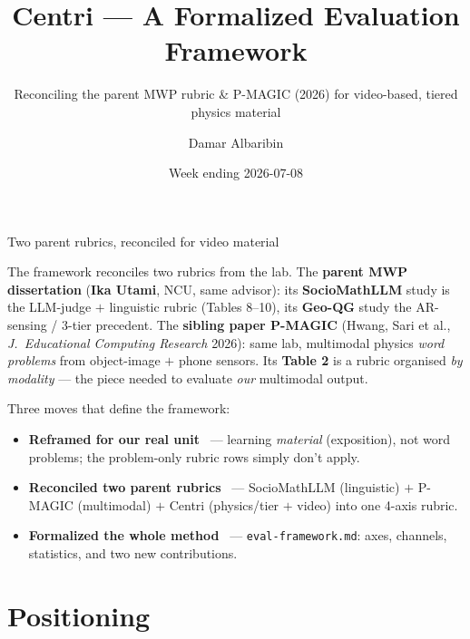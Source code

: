 \documentclass[aspectratio=169,10pt]{beamer}
\title{Centri --- A Formalized Evaluation Framework}
\subtitle{Reconciling the parent MWP rubric \& P-MAGIC (2026) for video-based, tiered physics material}
\author{Damar Albaribin}
\institute{MSc Thesis --- advisor: Prof.\ Wu-Yuin Hwang}
\date{Week ending 2026-07-08}
\newcommand{\ok}{{\color{cApp}\textbf{\checkmark}}}
\begin{document}
\maketitle

\begin{frame}{Two parent rubrics, reconciled for video material}
\small
\begin{tcolorbox}[colback=cGrey!8,colframe=cGrey,title=\footnotesize The two parents,boxsep=2pt,left=4pt,right=4pt]
\scriptsize
The framework reconciles two rubrics from the lab. The \textbf{parent MWP dissertation}
(\textbf{Ika Utami}, NCU, same advisor): its \textbf{SocioMathLLM} study is the LLM-judge $+$ linguistic
rubric (Tables 8--10), its \textbf{Geo-QG} study the AR-sensing / 3-tier precedent. The \textbf{sibling
paper P-MAGIC} (Hwang, Sari et al., \emph{J.\ Educational Computing Research} 2026): same lab, multimodal
physics \emph{word problems} from object-image $+$ phone sensors. Its \textbf{Table 2} is a rubric organised
\emph{by modality} --- the piece needed to evaluate \emph{our} multimodal output.
\end{tcolorbox}
\vspace{0.3em}
Three moves that define the framework:
\begin{itemize}\setlength\itemsep{2pt}
  \item \textbf{\color{cMeas}Reframed for our real unit} \ok\ --- learning \emph{material} (exposition),
  not word problems; the problem-only rubric rows simply don't apply.
  \item \textbf{\color{cPed}Reconciled two parent rubrics} \ok\ --- SocioMathLLM (linguistic) $+$ P-MAGIC
  (multimodal) $+$ Centri (physics/tier $+$ video) into one 4-axis rubric.
  \item \textbf{\color{cApp}Formalized the whole method} \ok\ --- \texttt{eval-framework.md}: axes,
  channels, statistics, and two new contributions.
\end{itemize}
\end{frame}

\section{Positioning}
\end{document}
